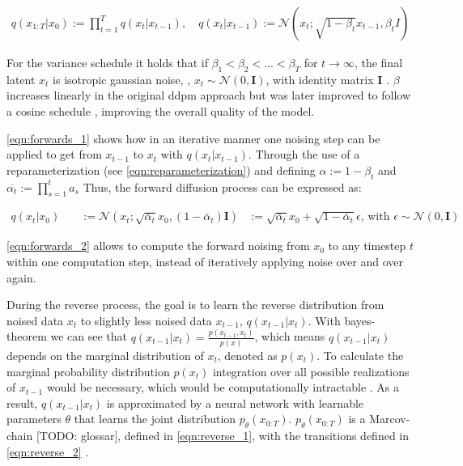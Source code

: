 \begin{equation}
  \label{eqn:forwards_1}
  \begin{align*}
    q(x_{1:T} | x_0) := \prod_{t=1}^T q(x_t | x_{t-1}), \quad
    q(x_t | x_{t-1}) := \mathcal{N}(x_t; \sqrt{1 - \beta_t} x_{t-1}, \beta_t I)
  \end{align*}
\end{equation}

For the variance schedule it holds that if $\beta_1 < \beta_2 < ... < \beta_T$ for $t\rightarrow\infty$, the final latent $x_t$ is isotropic gaussian noise, \ie, $x_t \sim \mathcal{N}(0, \textbf{I})$, with identity matrix $\textbf{I}$ \cite{zbinden2022ImplementingExperimentingDiffusion}.
$\beta$ increases linearly in the original \gls{ddpm} approach \cite{ho2020DenoisingDiffusionProbabilistic} but was later improved to follow a cosine schedule \cite{nichol2021ImprovedDenoisingDiffusion}, improving the overall quality of the model.

\autoref{eqn:forwards_1} \cite{ho2020DenoisingDiffusionProbabilistic} shows how in an iterative manner one noising step can be applied to get from $x_{t-1}$ to $x_t$ with $q(x_t | x_{t-1})$.
Through the use of a reparameterization (see \autoref{eqn:reparameterization}) and defining $\alpha := 1-\beta_t$ and $\overline{\alpha_t}:=\prod_{s=1}^{t}a_s$
Thus, the forward diffusion process can be expressed as:

\begin{equation}
  \label{eqn:forwards_2}
  \begin{align*}
    q(x_t | x_0) \quad & := \mathcal{N}(x_t; \sqrt{\bar{\alpha}_t} x_0, (1 - \bar{\alpha}_t) \textbf{I})
     &:= \sqrt{\bar{\alpha}_t} x_0 + \sqrt{1 - \bar{\alpha}_t} \epsilon \textrm{, with } \epsilon\sim\mathcal{N}(0, \textbf{I})
  \end{align*}
\end{equation}

\autoref{eqn:forwards_2}\cite{ho2020DenoisingDiffusionProbabilistic} allows to compute the forward noising from $x_0$ to any timestep $t$ within one computation step, instead of iteratively applying noise over and over again.

During the reverse process, the goal is to learn the reverse distribution from noised data $x_t$ to slightly less noised data $x_{t-1}$, $q(x_{t-1}|x_t)$.
With bayes-theorem we can see that $q(x_{t-1}|x_t) = \frac{p(x_{t-1},x_t)}{p(x)}$, which means $q(x_{t-1}|x_t)$ depends on the marginal distribution of $x_t$, denoted as $p(x_t)$.
To calculate the marginal probability distribution $p(x_t)$ integration over all possible realizations of $x_{t-1}$ would be necessary, which would be computationally intractable \cite{capel2022MasterThesisDenoising}.
As a result, $q(x_{t-1}|x_t)$ is approximated by a neural network with learnable parameters $\theta$ that learns the joint distribution $p_{\theta}(x_{0:T})$.
$p_{\theta}(x_{0:T})$ is a Marcov-chain [TODO: glossar], defined in \autoref{eqn:reverse_1}, with the transitions defined in \autoref{eqn:reverse_2} \cite{capel2022MasterThesisDenoising, ho2020DenoisingDiffusionProbabilistic}.

